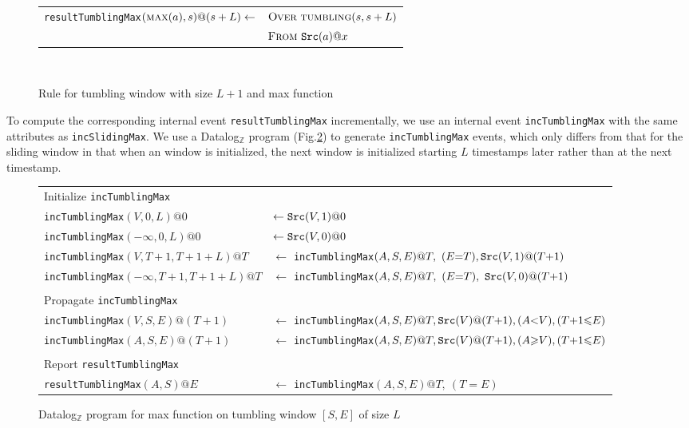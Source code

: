 \begin{figure}[h!]
\begin{tabular}{ll}
\texttt{resultTumblingMax}$(\textsc{max}(a),s)@(s+L) \leftarrow$    & $\textsc{Over}\ \mbox{\sc tumbling}(s,s+L)$\\
                                                                        & $\textsc{From}\ \mbox{\tt Src}(a)@x$
\end{tabular}\\
\caption{Rule for tumbling window with size $L{+}1$ and {\sc max} function}
\label{fig:tumbling-max-rule}
\end{figure}

To compute the corresponding
internal event \texttt{resultTumblingMax} incrementally,
we use an internal event \texttt{incTumblingMax}
with the same attributes as \texttt{incSlidingMax}.
We use a Datalog$_{\mathbb{Z}}$ program (Fig.\:\ref{fig:tumbling-max-program})
to generate
\texttt{incTumblingMax} events,
which only differs from that for the sliding window
in that
when an window is initialized,
the next window is initialized
starting $L$ timestamps later
rather than at the next timestamp.

\begin{figure}[h!]
\begin{mdframed}[leftmargin=0pt,rightmargin=0mm]
\begin{small}
\begin{tabular}{ll}
\multicolumn{2}{l}{Initialize \texttt{incTumblingMax}}\\
\texttt{incTumblingMax}$(V, 0, L)@0$ & $\leftarrow\mbox{\tt Src}(V,1)@0$\\
\texttt{incTumblingMax}$(-\infty, 0, L)@0$ & $\leftarrow \mbox{\tt Src}(V,0)@0$\\
\texttt{incTumblingMax}$(V, T{+}1, T{+}1{+}L)@T$ & $\leftarrow$ \texttt{incTumblingMax}$(A, S, E)@T,\ (E{=}T),\mbox{\tt \mbox{\tt Src}}(V,1)@(T{+}1)$\\
\texttt{incTumblingMax}$(-\infty, T{+}1, T{+}1{+}L)@T$ & $\leftarrow$ \texttt{incTumblingMax}$(A, S, E)@T,\ (E{=}T),\ \mbox{\tt Src}(V,0)@(T{+}1)$\\
& \\
\multicolumn{2}{l}{Propagate \texttt{incTumblingMax}}\\
\texttt{incTumblingMax}$(V, S, E)@(T{+}1)$ & $\leftarrow$ \texttt{incTumblingMax}$(A, S, E)@T ,\mbox{\tt Src}(V)@(T{+}1) ,(A{<}V),(T{+}1 {\leq} E)$\\
\texttt{incTumblingMax}$(A, S, E)@(T{+}1)$ & $\leftarrow$ \texttt{incTumblingMax}$(A, S, E)@T ,\mbox{\tt Src}(V)@(T{+}1) ,(A{\geq}V),(T{+}1 {\leq} E)$\\
& \\
\multicolumn{2}{l}{Report \texttt{resultTumblingMax}}\\
\texttt{resultTumblingMax}$(A, S)@E$ & $\leftarrow$ \texttt{incTumblingMax}$(A, S, E)@T,\ (T{=}E)$\\
\end{tabular}
\end{small}
\end{mdframed}
\caption{Datalog$_{\mathbb{Z}}$ program for {\sc max} function on tumbling window $[S,E]$ of size $L$}
\label{fig:tumbling-max-program}
\end{figure}


